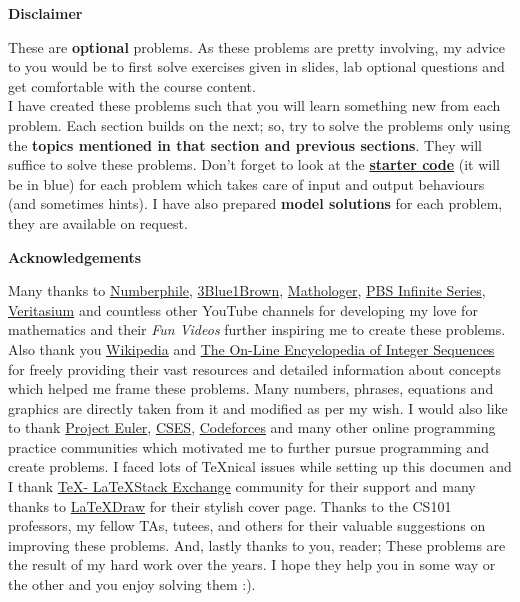 \begin{center}
	\textbf{\large{Disclaimer}}
\end{center}
These are \textbf{optional} problems.
As these problems are pretty involving, my advice to you would be to first solve exercises given in slides, lab optional questions and get comfortable with the course content.\\
I have created these problems such that you will learn something new from each problem. Each section builds on the next; so, try to solve the problems only using the \textbf{topics mentioned in that section and previous sections}. They will suffice to solve these problems. Don't forget to look at the \href{https://github.com/paramrathour/CS-101/tree/main/Starter%20Codes}{\textbf{starter code}} (it will be in blue) for each problem which takes care of input and output behaviours (and sometimes hints). I have also prepared \textbf{model solutions} for each problem, they are available on request.
\begin{center}
	\textbf{\large{Acknowledgements}}
\end{center}
Many thanks to \href{https://www.youtube.com/user/numberphile}{Numberphile}, \href{https://www.youtube.com/channel/UCYO_jab_esuFRV4b17AJtAw}{3Blue1Brown}, \href{https://www.youtube.com/channel/UC1_uAIS3r8Vu6JjXWvastJg}{Mathologer}, \href{https://www.youtube.com/channel/UCs4aHmggTfFrpkPcWSaBN9g}{PBS Infinite Series}, \href{https://www.youtube.com/user/1veritasium}{Veritasium} and countless other YouTube channels for developing my love for mathematics and their \emph{Fun Videos} further inspiring me to create these problems. Also thank you \href{https://en.wikipedia.org/wiki/Main_Page}{Wikipedia} and \href{http://oeis.org/}{The On-Line Encyclopedia of Integer Sequences} for freely providing their vast resources and detailed information about concepts which helped me frame these problems. Many numbers, phrases, equations and graphics are directly taken from it and modified as per my wish. I would also like to thank \href{https://projecteuler.net/}{Project Euler}, \href{https://cses.fi/problemset}{CSES}, \href{https://codeforces.com/}{Codeforces} and many other online programming practice communities which motivated me to further pursue programming and create problems. I faced lots of \TeX nical issues while setting up this documen and I thank \href{tex.stackexchange.com}{\TeX - \LaTeX Stack Exchange} community for their support and many thanks to \href{https://latexdraw.com/tikz-cover-pages-gallery/}{\LaTeX Draw} for their stylish cover page. Thanks to the CS101 professors, my fellow TAs, tutees, and others for their valuable suggestions on improving these problems. And, lastly thanks to you, reader; These problems are the result of my hard work over the years. I hope they help you in some way or the other and you enjoy solving them :).
